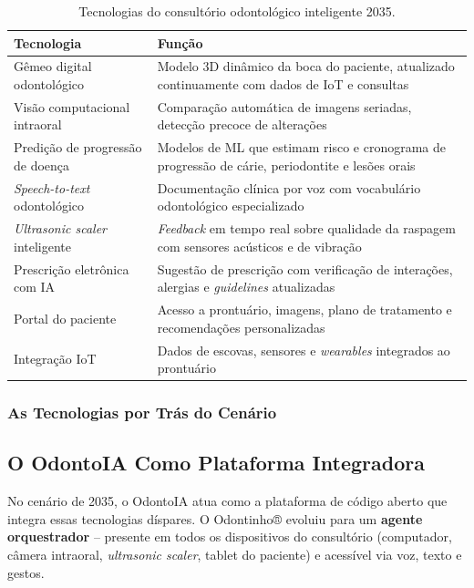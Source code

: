 \begin{table}[H]
  \centering
  \caption{Tecnologias do consultório odontológico inteligente 2035.}
  \label{tab:consultorio-2035}
  \begin{tabularx}{\textwidth}{lX}
    \toprule
    \textbf{Tecnologia} & \textbf{Função} \\
    \midrule
    Gêmeo digital odontológico & Modelo 3D dinâmico da boca do paciente,
      atualizado continuamente com dados de IoT e consultas \\
    Visão computacional intraoral & Comparação automática de imagens seriadas,
      detecção precoce de alterações \\
    Predição de progressão de doença & Modelos de ML que estimam risco e
      cronograma de progressão de cárie, periodontite e lesões orais \\
    \textit{Speech-to-text} odontológico & Documentação clínica por voz com
      vocabulário odontológico especializado \\
    \textit{Ultrasonic scaler} inteligente & \textit{Feedback} em tempo real
      sobre qualidade da raspagem com sensores acústicos e de vibração \\
    Prescrição eletrônica com IA & Sugestão de prescrição com verificação de
      interações, alergias e \textit{guidelines} atualizadas \\
    Portal do paciente & Acesso a prontuário, imagens, plano de tratamento e
      recomendações personalizadas \\
    Integração IoT & Dados de escovas, sensores e \textit{wearables} integrados
      ao prontuário \\
    \bottomrule
  \end{tabularx}
\end{table}

\subsubsection{As Tecnologias por Trás do Cenário}

\subsection{O OdontoIA Como Plataforma Integradora}

No cenário de 2035, o OdontoIA atua como a plataforma de código aberto que
integra essas tecnologias díspares. O Odontinho® evoluiu para um \textbf{agente
orquestrador} -- presente em todos os dispositivos do consultório (computador,
câmera intraoral, \textit{ultrasonic scaler}, tablet do paciente) e acessível
via voz, texto e gestos.

